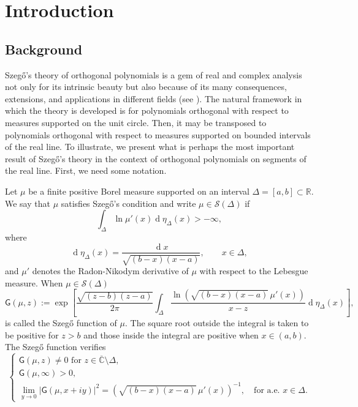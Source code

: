 \documentclass{amsart}
\numberwithin{equation}{section}
\theoremstyle{definition}
\DeclareMathOperator{\D}{d}        %
\newcommand{\RR}{\mathbb{R}}      %
\newcommand{\CC}{\mathbb{C}}      %
\begin{document}
\section{Introduction}

\subsection{Background}
Szeg\H{o}'s theory of orthogonal polynomials \cite[Chap. X-XII]{szego} is a gem of real and complex analysis not only for its intrinsic beauty but also because of its many consequences, extensions, and applications in different fields (see \cite{simon1,simon2}). The natural framework in which the theory is developed is for polynomials orthogonal with respect to measures supported on the unit circle. Then, it may be transposed to polynomials orthogonal with respect to measures supported on bounded intervals of the real line. To illustrate, we present what is perhaps the most important result of Szeg\H{o}'s theory in the context of orthogonal polynomials on segments of the real line. First, we need some notation.

Let $\mu$ be a finite positive Borel measure supported on an interval $\Delta = [a,b] \subset \RR$. We say that $\mu$ satisfies Szeg\H{o}'s condition and write $\mu \in \mathcal{S}(\Delta)$ if
  \begin{equation}
        \label{df:szego:c}
        \int_{\Delta}   {\ln \mu'(x)} \D \eta_{\Delta}(x)  > -\infty,
\end{equation}
where
\[ \D \eta_{\Delta}(x) = \frac{\D x}{\sqrt{(b-x)(x-a)}}, \qquad x \in \Delta,
\]
and $\mu'$ denotes the Radon-Nikodym derivative of $\mu$ with respect to the Lebesgue measure. When $\mu \in \mathcal{S}(\Delta)$
	\[
		\mathsf{G}(\mu,z) := \exp\left[\frac{\sqrt{(z-b)(z-a)}}{2\pi}\int_\Delta \frac{\ln(\sqrt{(b-x)(x-a)}\,\mu'(x))}{x-z}\D \eta_{\Delta}(x) \right],
	\]
    is called the Szeg\H{o} function of $\mu$. The square root outside the integral is taken to be positive for $z > b$ and those inside the integral are positive when $x \in (a,b)$. The Szeg\H{o} function verifies
	\begin{equation} \label{RN}
		\begin{cases}
			\mathsf{G}(\mu,z) \neq 0 \textrm{ for } z \in \overline{\CC}\setminus\Delta,\\
			\mathsf{G}(\mu,\infty)>0,\\
			\lim_{y \to 0} |\mathsf{G}(\mu,x+iy)|^2 =  (\sqrt{(b-x)(x-a)}\,\mu'(x))^{-1},\quad \textrm{for a.e.}\,\, x \in \Delta.
		\end{cases}
	\end{equation}
\end{document}
